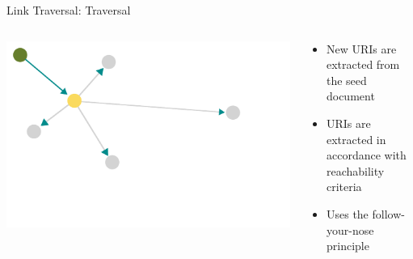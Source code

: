 \begin{frame}{Link Traversal: Traversal}
    \begin{columns}[T] %
        \begin{column}{0.6\textwidth} %
            \includegraphics[width=\linewidth]{images/showing-link-traversal-step-1.pdf} %
        \end{column}

        \begin{column}{0.4\textwidth} %
            \begin{itemize}
                \item New URIs are extracted from the seed document
                \item URIs are extracted in accordance with reachability criteria
                \item Uses the follow-your-nose principle
            \end{itemize}
        \end{column}
    \end{columns}
\end{frame}


